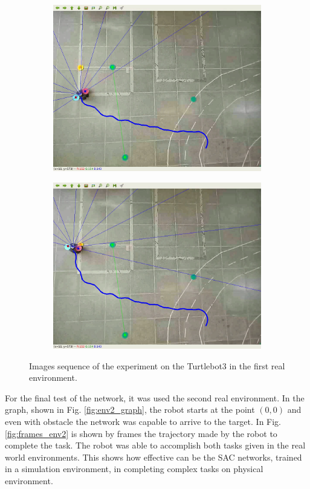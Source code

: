 \begin{figure}[htbp]
\begin{subfigure}[b]{0.115\textwidth}
        \includegraphics[width=\textwidth]{images/test_env1/7.png}
    \end{subfigure}
    \hfill
    \begin{subfigure}[b]{0.115\textwidth}
        \includegraphics[width=\textwidth]{images/test_env1/8.png}
    \end{subfigure}
    \caption{Images sequence of the experiment on the Turtlebot3 in the first real environment.}\label{fig:frames_env1}
\end{figure}

For the final test of the network, it was used the second real environment.
In the graph, shown in Fig. \ref{fig:env2_graph}, the robot starts at the point $(0, 0)$ and even with obstacle the network was capable to arrive to the target. In Fig. \ref{fig:frames_env2} is shown by frames the trajectory made by the robot to complete the task. %
The robot was able to accomplish both tasks given in the real world environments.
This shows how effective can be the SAC networks, trained in a simulation environment, in completing complex tasks on physical environment.

